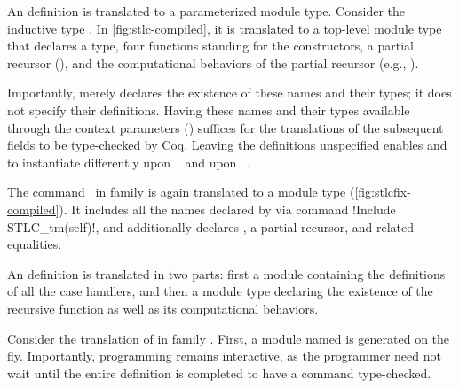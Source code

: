 



An  definition is translated to a parameterized module type.
Consider the inductive type .
In \cref{fig:stlc-compiled}, it is translated to a top-level module type
 that declares a  type,
four functions standing for the constructors,
a partial recursor (),
and the computational behaviors of the partial recursor
(e.g., ). %

Importantly,
 merely declares the existence of these names and their types;
it does not specify their definitions.
Having these names and their types available through the context parameters ()
suffices for the translations of the subsequent fields to be type-checked by Coq.
Leaving the definitions unspecified enables  and 
to instantiate  differently upon ~ and upon ~.

The command \dadada~in family
 is again translated to a module type  (\cref{fig:stlcfix-compiled}).
It includes all the names declared by 
via command \lsti!Include STLC\_tm(self)!,
and additionally declares , a partial recursor, and related equalities.



An  definition is translated in two parts:
first a module containing the definitions of all the case handlers,
and then a module type declaring the existence of the recursive function as well as
its computational behaviors.

Consider the translation of  in family .
First, a module named  is generated on the fly.
Importantly, programming remains interactive, as the programmer need not wait until the
entire  definition is completed to have a  command
type-checked.

